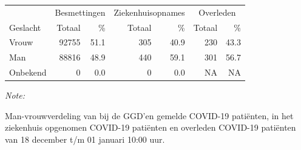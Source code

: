 \documentclass[
  english,
  man,floatsintext]{apa6}
\begin{document}
\begin{table}
\centering\begingroup\fontsize{11}{13}\selectfont

\begin{threeparttable}
\begin{tabular}{lrrrrrr}
\toprule
\multicolumn{1}{c}{ } & \multicolumn{2}{c}{Besmettingen} & \multicolumn{2}{c}{Ziekenhuisopnames} & \multicolumn{2}{c}{Overleden} \\
\cmidrule(l{3pt}r{3pt}){2-3} \cmidrule(l{3pt}r{3pt}){4-5} \cmidrule(l{3pt}r{3pt}){6-7}
Geslacht & Totaal & \% & Totaal & \% & Totaal & \%\\
\midrule
Vrouw & 92755 & 51.1 & 305 & 40.9 & 230 & 43.3\\
Man & 88816 & 48.9 & 440 & 59.1 & 301 & 56.7\\
Onbekend & 0 & 0.0 & 0 & 0.0 & NA & NA\\
\bottomrule
\end{tabular}
\begin{tablenotes}
\item \textit{Note: } 
\item Man-vrouwverdeling van bij de GGD’en gemelde COVID-19 patiënten, in het ziekenhuis opgenomen COVID-19 patiënten en overleden COVID-19 patiënten van 18 december t/m 01 januari 10:00 uur.
\end{tablenotes}
\end{threeparttable}
\endgroup{}
\end{table}
\newpage
\end{document}

